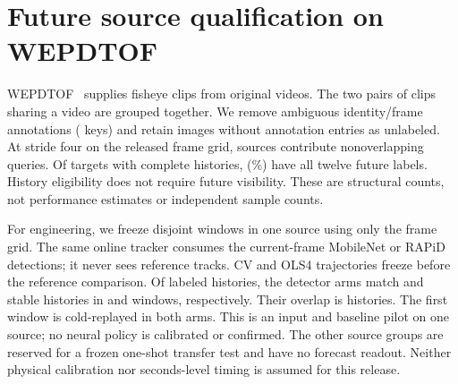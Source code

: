 \section{Future source qualification on WEPDTOF}
WEPDTOF~\cite{wepdtof} supplies \WepClips{} fisheye clips from
\WepSources{} original videos. The two pairs of clips sharing a
video are grouped together. We remove ambiguous identity/frame
annotations (\WepAmbiguous{} keys) and retain \WepUnlisted{} images
without annotation entries as unlabeled. At stride four on the
released frame grid, \WepEligibleSources{} sources contribute
\WepQueries{} nonoverlapping queries. Of \WepTargets{} targets
with complete histories, \WepComplete{} (\WepCompleteRate{}\%)
have all twelve future labels. History eligibility does not
require future visibility. These are structural counts, not
performance estimates or independent sample counts.

For engineering, we freeze \WepWindows{} disjoint windows in one
source using only the frame grid. The same online tracker consumes
the current-frame MobileNet or RAPiD detections; it never sees
reference tracks. CV and OLS4 trajectories freeze before the
reference comparison. Of \WepRef{} labeled histories, the detector
arms match \WepMobileHist{} and \WepRapidHist{} stable histories in
\WepMobileWindows{} and \WepRapidWindows{} windows, respectively.
Their overlap is \WepBothHist{} histories. \WepCommon{}
The first window is cold-replayed in both arms. This is an input
and baseline pilot on one source; no neural policy is calibrated
or confirmed. The other \WepReserved{} source groups are reserved
for a frozen one-shot transfer test and have no forecast readout.
Neither physical calibration nor seconds-level
timing is assumed for this release.
